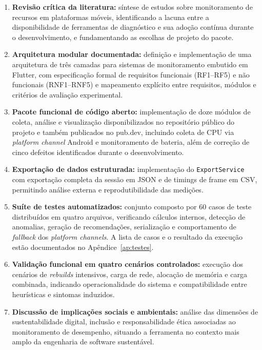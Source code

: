 \begin{enumerate}
  \item \textbf{Revisão crítica da literatura:} síntese de estudos sobre monitoramento de recursos em plataformas móveis, identificando a lacuna entre a disponibilidade de ferramentas de diagnóstico e sua adoção contínua durante o desenvolvimento, e fundamentando as escolhas de projeto do pacote.

  \item \textbf{Arquitetura modular documentada:} definição e implementação de uma arquitetura de três camadas para sistemas de monitoramento embutido em Flutter, com especificação formal de requisitos funcionais (RF1--RF5) e não funcionais (RNF1--RNF5) e mapeamento explícito entre requisitos, módulos e critérios de avaliação experimental.

  \item \textbf{Pacote funcional de código aberto:} implementação de doze módulos de coleta, análise e visualização disponibilizados no repositório público do projeto e também publicados no pub.dev, incluindo coleta de CPU via \textit{platform channel} Android e monitoramento de bateria, além de correção de cinco defeitos identificados durante o desenvolvimento.

  \item \textbf{Exportação de dados estruturada:} implementação do \texttt{ExportService} com exportação completa da sessão em JSON e de timings de frame em CSV, permitindo análise externa e reprodutibilidade das medições.

  \item \textbf{Suíte de testes automatizados:} conjunto composto por 60 casos de teste distribuídos em quatro arquivos, verificando cálculos internos, detecção de anomalias, geração de recomendações, serialização e comportamento de \textit{fallback} dos \textit{platform channels}. A lista de casos e o resultado da execução estão documentados no Apêndice~\ref{ap:testes}.

  \item \textbf{Validação funcional em quatro cenários controlados:} execução dos cenários de \textit{rebuilds} intensivos, carga de rede, alocação de memória e carga combinada, indicando operacionalidade do sistema e compatibilidade entre heurísticas e sintomas induzidos.

  \item \textbf{Discussão de implicações sociais e ambientais:} análise das dimensões de sustentabilidade digital, inclusão e responsabilidade ética associadas ao monitoramento de desempenho, situando a ferramenta no contexto mais amplo da engenharia de software sustentável.
\end{enumerate}

